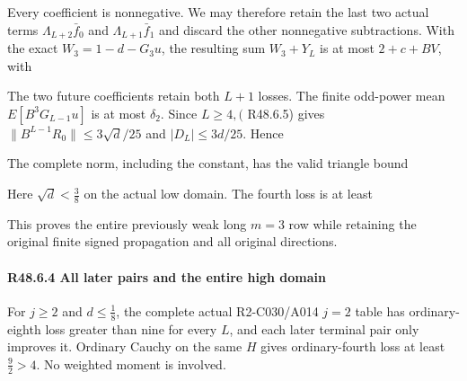 Every coefficient is nonnegative. We may therefore retain the last two actual terms \(\Lambda_{L+2} \bar f_{0}\) and \(\Lambda_{L+1} \bar f_1\) and discard the other nonnegative subtractions. With the exact \(W_{3}=1-d-G_{3} u\), the resulting sum \(W_{3}+Y_L\) is at most \(2+c+BV\), with


The two future coefficients retain both \(L+1\) losses. The finite odd-power mean \(E[B^3 G_{L-1}u]\) is at most \(\delta_2\). Since \(L\ge 4,\allowbreak \allowbreak  (\) R48.6.5) gives \(\lVert B^{L-1}R_0\rVert \le 3 \sqrt{d}/25\) and \(\lvert D_L\rvert \le 3d/25\). Hence


The complete norm, including the constant, has the valid triangle bound


Here \(\sqrt{d}<\frac{3}{8}\) on the actual low domain. The fourth loss is at least


This proves the entire previously weak long \(m=3\) row while retaining the original finite signed propagation and all original directions.

\paragraph{R48.6.4 All later pairs and the entire high domain}

For \(j\ge 2\) and \(d\le \frac{1}{8}\), the complete actual R2-C030/A014 \(j=2\) table has ordinary-eighth loss greater than nine for every \(L\), and each later terminal pair only improves it. Ordinary Cauchy on the same \(H\) gives ordinary-fourth loss at least \(\frac{9}{2}>4\). No weighted moment is involved.

